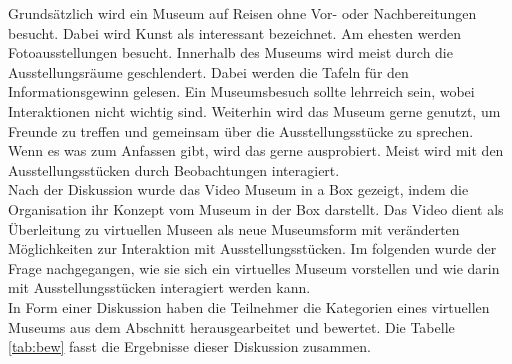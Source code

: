\documentclass[runningheads,a4paper, 12pt]{llncs}
\begin{document}
Grundsätzlich wird ein Museum auf Reisen ohne Vor- oder Nachbereitungen besucht. Dabei wird Kunst als interessant bezeichnet. Am ehesten werden Fotoausstellungen besucht. Innerhalb des Museums wird meist durch die Ausstellungsräume geschlendert. Dabei werden die Tafeln für den Informationsgewinn gelesen. Ein Museumsbesuch sollte lehrreich sein, wobei Interaktionen nicht wichtig sind. Weiterhin wird das Museum gerne genutzt, um  Freunde zu treffen und gemeinsam über die Ausstellungsstücke zu sprechen. Wenn es was zum Anfassen gibt, wird das gerne ausprobiert. Meist wird mit den Ausstellungsstücken durch Beobachtungen interagiert.\\

Nach der Diskussion wurde das Video Museum in a Box gezeigt, indem die Organisation ihr Konzept vom Museum in der Box darstellt. Das Video dient als Überleitung zu virtuellen Museen als neue Museumsform mit veränderten Möglichkeiten zur Interaktion mit Ausstellungsstücken. Im folgenden wurde der Frage nachgegangen, wie sie sich ein virtuelles Museum vorstellen und wie darin mit Ausstellungsstücken interagiert werden kann.\\

In Form einer Diskussion haben die Teilnehmer die Kategorien eines virtuellen Museums aus dem Abschnitt  herausgearbeitet und bewertet. Die Tabelle \ref{tab:bew} fasst die Ergebnisse dieser Diskussion zusammen.\\
\end{document}
